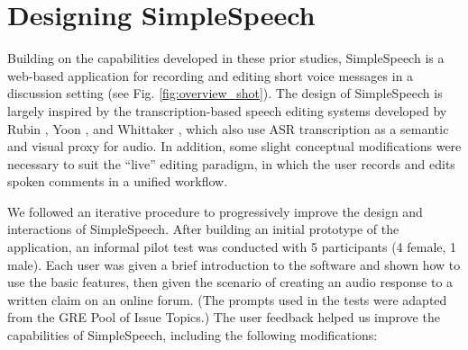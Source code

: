 
\section{Designing SimpleSpeech}

Building on the capabilities developed in these prior studies, SimpleSpeech is a web-based application for recording and editing short voice messages in a discussion setting (see Fig. \ref{fig:overview_shot}).
The design of SimpleSpeech is largely inspired by the transcription-based speech editing systems developed by Rubin \cite{rubin}, Yoon \cite{yoon}, and Whittaker \cite{whittaker_semantic}, which also use ASR transcription as a semantic and visual proxy for audio.
In addition, some slight conceptual modifications were necessary to suit the ``live'' editing paradigm, in which the user records and edits spoken comments in a unified workflow.

We followed an iterative procedure to progressively improve the design and interactions of SimpleSpeech.
After building an initial prototype of the application, an informal pilot test was conducted with 5 participants (4 female, 1 male). 
Each user was given a brief introduction to the software and shown how to use the basic features, then given the scenario of creating an audio response to a written claim on an online forum. 
(The prompts used in the tests were adapted from the GRE Pool of Issue Topics.)
The user feedback helped us improve the capabilities of SimpleSpeech, including the following modifications:

